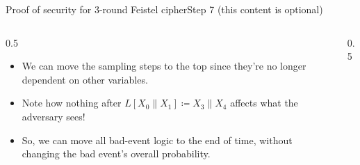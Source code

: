 \ifdefined\PRESENTATION\else\PassOptionsToClass{handout}{beamer}\fi\documentclass[aspectratio=169, lualatex]{beamer}
\begin{document}
	\begin{frame}{Proof of security for 3-round Feistel cipher}{Step 7 (this content is optional)}
		\begin{columns}[c]
			\begin{column}{0.5\textwidth}
				\begin{itemize}
					\item We can move the sampling steps to the top since they're no longer dependent on other variables.
					\item Note how nothing after $L[X_0\|X_1] \coloneq X_3\|X_4$ affects what the adversary sees!
					\item So, we can move all bad-event logic to the end of time, without changing the bad event's overall probability.
				\end{itemize}
			\end{column}
			\begin{column}{0.5\textwidth}
				\vspace{-1.5cm}
				\begin{center}
				\end{center}
			\end{column}
		\end{columns}
	\end{frame}
\end{document}
